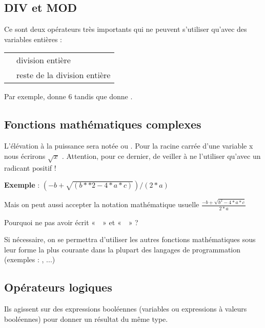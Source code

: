 		\subsection{DIV et MOD}
	
			Ce sont deux opérateurs très importants qui ne peuvent s’utiliser
			qu’avec des variables entières :
	
			\begin{center}
			\tablehead{}
			\begin{supertabular}{m{1cm}|m{12cm}}
			\raggedleft  {} & division entière\\
			\raggedleft  {} & reste de la division entière\\
			\end{supertabular}
			\end{center}
	
			Par exemple,  donne 6 tandis que
			 donne .
	
		\subsection{Fonctions mathématiques complexes}
	
			L’élévation à la puissance sera notée \textstyleCodeInsr{**} ou
			\textstyleCodeInsr{\^{}} . Pour la racine carrée d’une variable x nous
			écrirons  $\sqrt{x}$ \textit{.} Attention, pour ce dernier, de veiller
			à ne l’utiliser qu’avec un radicant positif !
	
			\textbf{Exemple} : 
			$(-b+\sqrt{(b\ast \ast 2-4\ast a\ast c)})/(2\ast a)$
			
			Mais on peut aussi accepter la notation mathématique usuelle
			$\frac{-b+\sqrt{b^{2}-4\ast a\ast c}}{2\ast a}$ 
	
			Pourquoi ne pas avoir écrit «~~» et
			«~~» ?
	
			Si nécessaire, on se permettra d'utiliser les autres
			fonctions mathématiques sous leur forme la plus courante dans la
			plupart des langages de programmation (exemples :
			, ...)
	
		\subsection{Opérateurs logiques}
	
			Ils agissent sur des expressions booléennes (variables ou expressions à
			valeurs booléennes) pour donner un résultat du même type.
	
